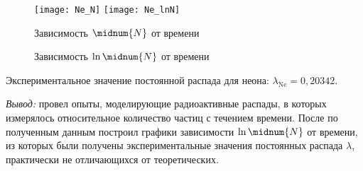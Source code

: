     \begin{figure}[h!]
        \center
        \texttt{[image: Ne\_N]} \hfill
        \texttt{[image: Ne\_lnN]}
        \parbox{.47\textwidth}{\caption{Зависимость \( \midnum{N} \) от времени}} \hfill
        \parbox{.47\textwidth}{\caption{Зависимость \( \ln \midnum{N} \) от времени}}
    \end{figure}

    Экспериментальное значение постоянной распада для неона:
    \( \lambda_\mathrm{Ne} = 0,\!20342 \).
    
    \vspace*{2em}
    \emph{Вывод:} провел опыты, моделирующие радиоактивные распады, в которых
    измерялось относительное количество частиц с течением времени. После по
    полученным данным построил графики зависимости \( \ln \midnum{N} \) от
    времени, из которых были получены экспериментальные значения постоянных
    распада \( \lambda \), практически не отличающихся от теоретических.


